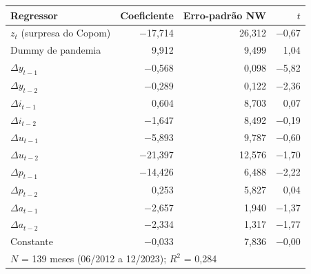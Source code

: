 \begin{tabular}{lrrr}
\toprule
Regressor & Coeficiente & Erro-padrão NW & $t$ \\
\midrule
$z_t$ (surpresa do Copom) & \ensuremath{-}17{,}714 & 26{,}312 & \ensuremath{-}0{,}67 \\
Dummy de pandemia & 9{,}912 & 9{,}499 & 1{,}04 \\
$\Delta y_{t-1}$ & \ensuremath{-}0{,}568 & 0{,}098 & \ensuremath{-}5{,}82 \\
$\Delta y_{t-2}$ & \ensuremath{-}0{,}289 & 0{,}122 & \ensuremath{-}2{,}36 \\
$\Delta i_{t-1}$ & 0{,}604 & 8{,}703 & 0{,}07 \\
$\Delta i_{t-2}$ & \ensuremath{-}1{,}647 & 8{,}492 & \ensuremath{-}0{,}19 \\
$\Delta u_{t-1}$ & \ensuremath{-}5{,}893 & 9{,}787 & \ensuremath{-}0{,}60 \\
$\Delta u_{t-2}$ & \ensuremath{-}21{,}397 & 12{,}576 & \ensuremath{-}1{,}70 \\
$\Delta p_{t-1}$ & \ensuremath{-}14{,}426 & 6{,}488 & \ensuremath{-}2{,}22 \\
$\Delta p_{t-2}$ & 0{,}253 & 5{,}827 & 0{,}04 \\
$\Delta a_{t-1}$ & \ensuremath{-}2{,}657 & 1{,}940 & \ensuremath{-}1{,}37 \\
$\Delta a_{t-2}$ & \ensuremath{-}2{,}334 & 1{,}317 & \ensuremath{-}1{,}77 \\
Constante & \ensuremath{-}0{,}033 & 7{,}836 & \ensuremath{-}0{,}00 \\
\midrule
\multicolumn{4}{l}{$N$ = 139 meses (06/2012 a 12/2023); $R^2$ = 0{,}284} \\
\bottomrule
\end{tabular}

